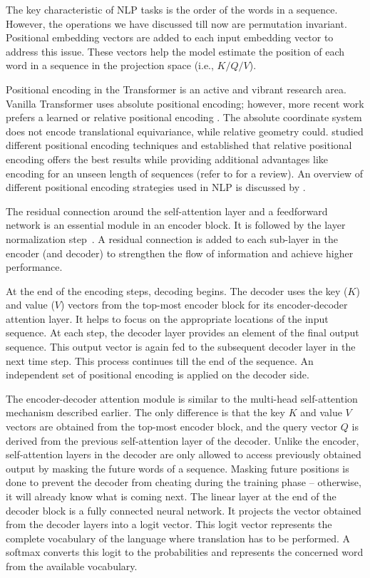 The key characteristic of NLP tasks is the order of the words in a sequence. However, the operations we have discussed till now are permutation invariant. Positional embedding vectors are added to each input embedding vector to address this issue. These vectors help the model estimate the position of each word in a sequence in the projection space (i.e., $K/Q/V$).

Positional encoding in the Transformer is an active and vibrant research area. Vanilla Transformer \citep{vaswani2017attention} uses absolute positional encoding; however, more recent work \citep{DBLP:journals/corr/abs-1810-04805,Dosovitskiy2020-iq} prefers a learned \citep{gehring2017convolutional} or relative positional encoding \citep{shaw2018self}. The absolute coordinate system does not encode translational equivariance, while relative geometry could. \cite{ramachandran2019stand,bello2019attention} studied different positional encoding techniques and established that relative positional encoding offers the best results while providing additional advantages like encoding for an unseen length of sequences (refer to \cite{wu2021rethinking} for a review). An overview of different positional encoding strategies used in NLP is discussed by \citet{dufter2021position}. 


The residual connection around the self-attention layer and a feedforward network is an essential module in an encoder block. It is followed by the layer normalization step~\citep{baevski2018adaptive,wang2019learning,Dosovitskiy2020-iq}. A residual connection is added to each sub-layer in the encoder (and decoder) to strengthen the flow of information and achieve higher performance.

At the end of the encoding steps, decoding begins. The decoder uses the key ($K$) and value ($V$) vectors from the top-most encoder block for its encoder-decoder attention layer. It helps to focus on the appropriate locations of the input sequence. At each step, the decoder layer provides an element of the final output sequence. This output vector is again fed to the subsequent decoder layer in the next time step. This process continues till the end of the sequence. An independent set of positional encoding is applied on the decoder side. 

The encoder-decoder attention module is similar to the multi-head self-attention mechanism described earlier. The only difference is that the key $K$ and value $V$ vectors are obtained from the top-most encoder block, and the query vector $Q$ is derived from the previous self-attention layer of the decoder. Unlike the encoder, self-attention layers in the decoder are only allowed to access previously obtained output by masking the future words of a sequence. Masking future positions is done to prevent the decoder from cheating during the training phase -- otherwise, it will already know what is coming next. The linear layer at the end of the decoder block is a fully connected neural network. It projects the vector obtained from the decoder layers into a logit vector. This logit vector represents the complete vocabulary of the language where translation has to be performed. A softmax converts this logit to the probabilities and represents the concerned word from the available vocabulary. 

